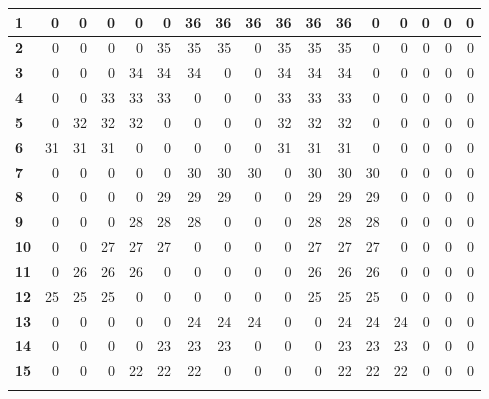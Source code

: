 \begin{table}[ht]
{\begin{tabular}{|l|r|r|r|r|r|r|r|r|r|r|r|r|r|r|r|r|}
				\textbf{1}  & 0  & 0  & 0  & 0  & 0  & 36 & 36 & 36 & 36 & 36 & 36 & 0  & 0  & 0  & 0  & 0 \\ \hline
				\rowcolor[HTML]{FFFFFF} 
				\textbf{2}  & 0  & 0  & 0  & 0  & 35 & 35 & 35 & 0  & 35 & 35 & 35 & 0  & 0  & 0  & 0  & 0 \\ \hline
				\rowcolor[HTML]{E2EFDA} 
				\textbf{3}  & 0  & 0  & 0  & 34 & 34 & 34 & 0  & 0  & 34 & 34 & 34 & 0  & 0  & 0  & 0  & 0 \\ \hline
				\rowcolor[HTML]{FFFFFF} 
				\textbf{4}  & 0  & 0  & 33 & 33 & 33 & 0  & 0  & 0  & 33 & 33 & 33 & 0  & 0  & 0  & 0  & 0 \\ \hline
				\rowcolor[HTML]{E2EFDA} 
				\textbf{5}  & 0  & 32 & 32 & 32 & 0  & 0  & 0  & 0  & 32 & 32 & 32 & 0  & 0  & 0  & 0  & 0 \\ \hline
				\rowcolor[HTML]{FFFFFF} 
				\textbf{6}  & 31 & 31 & 31 & 0  & 0  & 0  & 0  & 0  & 31 & 31 & 31 & 0  & 0  & 0  & 0  & 0 \\ \hline
				\rowcolor[HTML]{E2EFDA} 
				\textbf{7}  & 0  & 0  & 0  & 0  & 0  & 30 & 30 & 30 & 0  & 30 & 30 & 30 & 0  & 0  & 0  & 0 \\ \hline
				\rowcolor[HTML]{FFFFFF} 
				\textbf{8}  & 0  & 0  & 0  & 0  & 29 & 29 & 29 & 0  & 0  & 29 & 29 & 29 & 0  & 0  & 0  & 0 \\ \hline
				\rowcolor[HTML]{E2EFDA} 
				\textbf{9}  & 0  & 0  & 0  & 28 & 28 & 28 & 0  & 0  & 0  & 28 & 28 & 28 & 0  & 0  & 0  & 0 \\ \hline
				\rowcolor[HTML]{FFFFFF} 
				\textbf{10} & 0  & 0  & 27 & 27 & 27 & 0  & 0  & 0  & 0  & 27 & 27 & 27 & 0  & 0  & 0  & 0 \\ \hline
				\rowcolor[HTML]{E2EFDA} 
				\textbf{11} & 0  & 26 & 26 & 26 & 0  & 0  & 0  & 0  & 0  & 26 & 26 & 26 & 0  & 0  & 0  & 0 \\ \hline
				\rowcolor[HTML]{FFFFFF} 
				\textbf{12} & 25 & 25 & 25 & 0  & 0  & 0  & 0  & 0  & 0  & 25 & 25 & 25 & 0  & 0  & 0  & 0 \\ \hline
				\rowcolor[HTML]{E2EFDA} 
				\textbf{13} & 0  & 0  & 0  & 0  & 0  & 24 & 24 & 24 & 0  & 0  & 24 & 24 & 24 & 0  & 0  & 0 \\ \hline
				\rowcolor[HTML]{FFFFFF} 
				\textbf{14} & 0  & 0  & 0  & 0  & 23 & 23 & 23 & 0  & 0  & 0  & 23 & 23 & 23 & 0  & 0  & 0 \\ \hline
				\rowcolor[HTML]{E2EFDA} 
				\textbf{15} & 0  & 0  & 0  & 22 & 22 & 22 & 0  & 0  & 0  & 0  & 22 & 22 & 22 & 0  & 0  & 0 \\ \hline
				\rowcolor[HTML]{FFFFFF} 

\end{tabular}}
\end{table}
